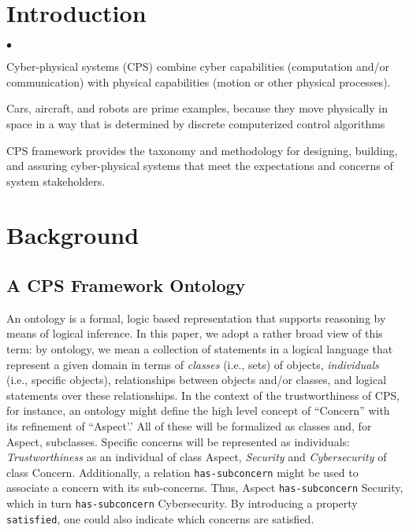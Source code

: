 \section{Introduction}

\begin{list}{$\bullet$}{\itemsep=0pt \parsep=1pt \topsep=1pt \leftmargin=12pt} 
\item Cyber-physical systems (CPS) combine cyber capabilities (computation and/or communication) with physical capabilities (motion or other physical processes).
 
\item Cars, aircraft,
and robots are prime examples, because they move physically in space in a way that is determined by discrete computerized control algorithms

\item CPS framework provides the taxonomy and methodology for designing, building, and assuring cyber-physical systems that meet the expectations and concerns of system stakeholders.
\end{list}

\section{Background}
%
\subsection{A CPS Framework Ontology}
\label{CPS_ontology}
%
An ontology is a formal, logic based representation that supports reasoning by means of logical inference. In this paper, we adopt a rather broad view of this term: by ontology, we mean a collection of statements in a logical language that represent a given domain in terms of \emph{classes} (i.e., sets) of objects, \emph{individuals} (i.e., specific objects), relationships between objects and/or classes, and logical statements over these relationships. In the context of the trustworthiness of CPS, for instance, an ontology might define the high level concept of ``Concern'' with its refinement of ``Aspect'.' All of these will be formalized as classes and, for Aspect, subclasses. Specific concerns will be represented as individuals: \emph{Trustworthiness} as an individual of class Aspect, \emph{Security} and \emph{Cybersecurity} of class Concern. Additionally, a relation {\tt has-subconcern} might be used to associate a concern with its sub-concerns. Thus, Aspect {\tt has-subconcern} Security, which in turn {\tt has-subconcern} Cybersecurity. By introducing a property {\tt satisfied}, one could also indicate which concerns are satisfied.

